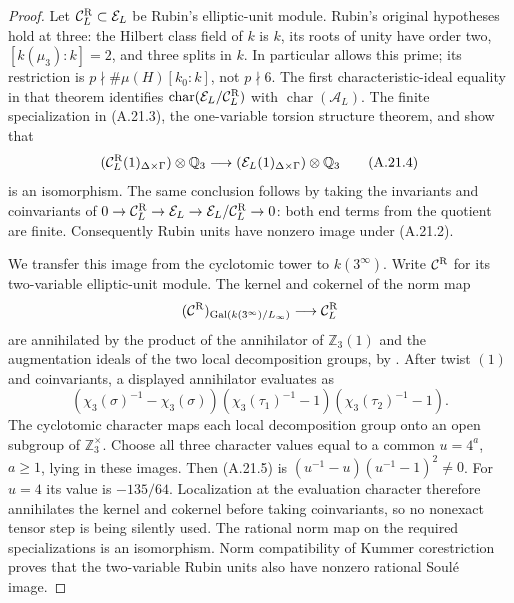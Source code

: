 \begin{proof}
Let \(\mathcal C_L^{\rm R}\subset\mathcal E_L\) be
Rubin's elliptic-unit module. Rubin's original
hypotheses hold at three: the Hilbert class field of
\(k\) is \(k\), its roots of unity have order two,
\([k(\mu_3):k]=2\), and three splits in \(k\).
In particular \cite[\S4, Theorem 4.1(i)]{DE_Rubin1991}
allows this prime; its restriction is
\(p\nmid\#\mu(H)[k_0:k]\), not \(p\nmid6\).
The first characteristic-ideal equality in that
theorem identifies
\(\operatorname{char}(\mathcal E_L/\mathcal C_L^{\rm R})\)
with \(\operatorname{char}(\mathcal A_L)\).
The finite specialization in (A.21.3), the
one-variable torsion structure theorem, and
\cite[Corollary 7.8]{DE_Rubin1991} show that
\[
 (\mathcal C_L^{\rm R}(1)_{\Delta\times\Gamma})\otimes\mathbb Q_3
 \longrightarrow
 (\mathcal E_L(1)_{\Delta\times\Gamma})\otimes\mathbb Q_3
                                                               \tag{A.21.4}
\]
is an isomorphism. The same conclusion follows by
taking the invariants and coinvariants of
\(0\to\mathcal C_L^{\rm R}\to\mathcal E_L
\to\mathcal E_L/\mathcal C_L^{\rm R}\to0\): both
end terms from the quotient are finite. Consequently
Rubin units have nonzero image under (A.21.2).

We transfer this image from the cyclotomic tower to
\(k(3^\infty)\). Write \(\mathcal C^{\rm R}\) for
its two-variable elliptic-unit module. The kernel and
cokernel of the norm map
\[
 (\mathcal C^{\rm R})_{\operatorname{Gal}(k(3^\infty)/L_\infty)}
                   \longrightarrow\mathcal C_L^{\rm R}
\]
are annihilated by the product of the annihilator of
\(\mathbb Z_3(1)\) and the augmentation ideals of the
two local decomposition groups, by
\cite[Theorem 7.7(ii)]{DE_Rubin1991}. After twist \((1)\)
and coinvariants, a displayed annihilator evaluates as
\[
 (\chi_3(\sigma)^{-1}-\chi_3(\sigma))
 (\chi_3(\tau_1)^{-1}-1)
 (\chi_3(\tau_2)^{-1}-1).                              \tag{A.21.5}
\]
The cyclotomic character maps each local decomposition
group onto an open subgroup of \(\mathbb Z_3^\times\).
Choose all three character values equal to a common
\(u=4^a\), \(a\ge1\), lying in these images. Then
(A.21.5) is \((u^{-1}-u)(u^{-1}-1)^2\ne0\).
For \(u=4\) its value is \(-135/64\).
Localization at the evaluation character therefore
annihilates the kernel and cokernel before taking
coinvariants, so no nonexact tensor step is being
silently used. The rational norm map on the required
specializations is an isomorphism. Norm compatibility
of Kummer corestriction proves that the two-variable
Rubin units also have nonzero rational Soul\'e image.


\end{proof}
